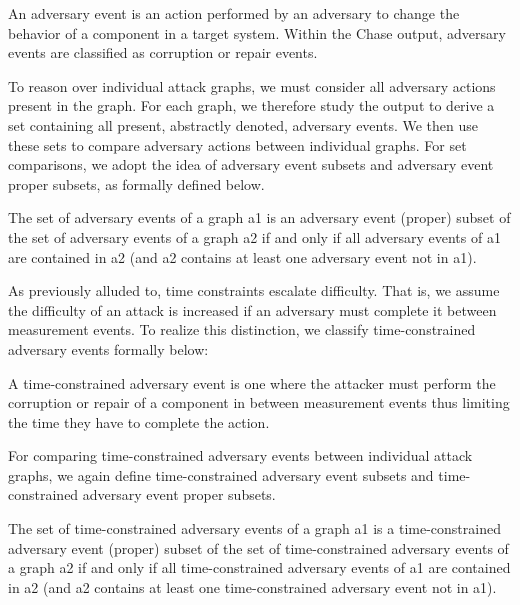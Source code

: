 \documentclass[runningheads]{llncs}
\theoremstyle{definition}
\begin{document}
\begin{definition}
    An adversary event is an action performed by an adversary to change the behavior of a component in a target system. Within the Chase output, adversary events are classified as  corruption or repair events. 
\end{definition}

\noindent To reason over individual attack graphs, we must consider all adversary actions present in the graph. For each graph, we therefore study the output to derive a set containing all present, abstractly denoted, adversary events. We then use these sets to compare adversary actions between individual graphs. For set comparisons, we adopt the idea of adversary event subsets and adversary event proper subsets, as formally defined below. 

\begin{definition}
    The set of adversary events of a graph a1 is an adversary event (proper) subset of the set of adversary events of a graph a2 if and only if all adversary events of a1 are contained in a2 (and a2 contains at least one adversary event not in a1).
 \end{definition}

As previously alluded to, time constraints escalate difficulty. That is, we assume the difficulty of an attack is increased if an adversary must complete it between measurement events. To realize this distinction, we classify time-constrained adversary events formally below:  

\begin{definition}
    A time-constrained adversary event is one where the attacker must perform the corruption or repair of a component in between measurement events thus limiting the time they have to complete the action.  
\end{definition}

\noindent For comparing time-constrained adversary events between individual attack graphs, we again define time-constrained adversary event subsets and time-constrained adversary event proper subsets.
 
 \begin{definition}   
    The set of time-constrained adversary events of a graph a1 is a time-constrained adversary event (proper) subset of the set of time-constrained adversary events of a graph a2 if and only if all time-constrained adversary events of a1 are contained in a2 (and a2 contains at least one time-constrained adversary event not in a1).
 \end{definition}
\end{document}
